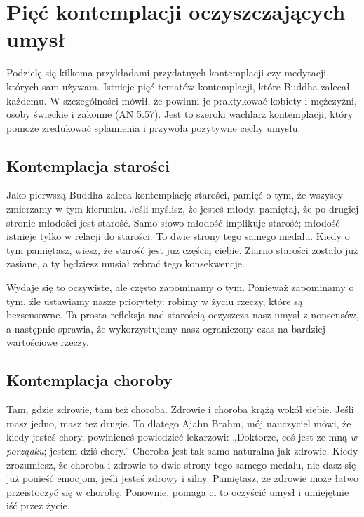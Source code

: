 \documentclass[12pt,openany]{book}
\begin{document}
\chapter*{Pięć kontemplacji oczyszczających umysł}

Podzielę się kilkoma przykładami przydatnych kontemplacji czy medytacji, których sam używam. Istnieje pięć tematów kontemplacji, które Buddha zalecał każdemu. W szczególności mówił, że powinni je praktykować kobiety i mężczyźni, osoby świeckie i zakonne (AN 5.57). Jest to szeroki wachlarz kontemplacji, który pomoże zredukować splamienia i przywoła pozytywne cechy umysłu.

\section*{Kontemplacja starości}

Jako pierwszą Buddha zaleca kontemplację starości, pamięć o \linebreak tym, że wszyscy zmierzamy w tym kierunku. Jeśli myślisz, że jesteś młody, pamiętaj, że po drugiej stronie młodości jest starość. Samo słowo młodość implikuje starość; młodość istnieje tylko w relacji do starości. To dwie strony tego samego medalu. Kiedy o tym pamiętasz, wiesz, że starość jest już częścią ciebie. Ziarno starości zostało już zasiane, a ty będziesz musiał zebrać tego konsekwencje.

Wydaje się to oczywiste, ale często zapominamy o tym. Ponieważ zapominamy o tym, źle ustawiamy nasze priorytety: robimy w życiu rzeczy, które są bezsensowne. Ta prosta refleksja nad starością oczyszcza nasz umysł z nonsensów, a następnie sprawia, że wykorzystujemy nasz ograniczony czas na bardziej war\-to\-ścio\-we rzeczy.

\section*{Kontemplacja choroby}

Tam, gdzie zdrowie, tam też choroba. Zdrowie i choroba krążą wokół siebie. Jeśli masz jedno, masz też drugie. To dlatego Ajahn Brahm, mój nauczyciel mówi, że kiedy jesteś chory, powinieneś powiedzieć lekarzowi: „Doktorze, coś jest ze mną \textit{w porządku}; jestem dziś chory.” Choroba jest tak samo naturalna jak zdrowie. Kiedy zrozumiesz, że choroba i zdrowie to dwie strony tego samego medalu, nie dasz się już ponieść emocjom, jeśli jesteś zdro\-wy i silny. Pamiętasz, że zdrowie może łatwo przeistoczyć się w chorobę. Ponownie, pomaga ci to oczyścić umysł i umiejętnie iść przez życie.
\end{document}
